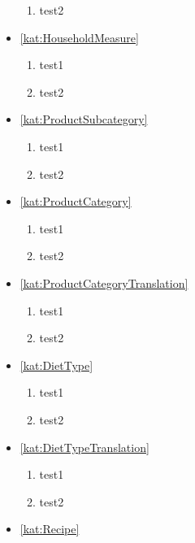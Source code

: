 \begin{itemize}[label={\textbf{Reguły dla}}, wide, labelwidth=!, labelindent=0pt]
\begin{enumerate}[label={\textbf{REG/\protect\threedigits{\arabic{enumi}}}}, wide, labelwidth=!, resume]
        \item test2
    \end{enumerate}
    \item\ref{kat:HouseholdMeasure}
    \begin{enumerate}[label={\textbf{REG/\protect\threedigits{\arabic{enumi}}}}, wide, labelwidth=!, resume]
        \item test1
        \item test2
    \end{enumerate}
    \item\ref{kat:ProductSubcategory}
    \begin{enumerate}[label={\textbf{REG/\protect\threedigits{\arabic{enumi}}}}, wide, labelwidth=!, resume]
        \item test1
        \item test2
    \end{enumerate}
    \item\ref{kat:ProductCategory}
    \begin{enumerate}[label={\textbf{REG/\protect\threedigits{\arabic{enumi}}}}, wide, labelwidth=!, resume]
        \item test1
        \item test2
    \end{enumerate}
    \item\ref{kat:ProductCategoryTranslation}
    \begin{enumerate}[label={\textbf{REG/\protect\threedigits{\arabic{enumi}}}}, wide, labelwidth=!, resume]
        \item test1
        \item test2
    \end{enumerate}
    \item\ref{kat:DietType}
    \begin{enumerate}[label={\textbf{REG/\protect\threedigits{\arabic{enumi}}}}, wide, labelwidth=!, resume]
        \item test1
        \item test2
    \end{enumerate}
    \item\ref{kat:DietTypeTranslation}
    \begin{enumerate}[label={\textbf{REG/\protect\threedigits{\arabic{enumi}}}}, wide, labelwidth=!, resume]
        \item test1
        \item test2
    \end{enumerate}
    \item\ref{kat:Recipe}

\end{itemize}
